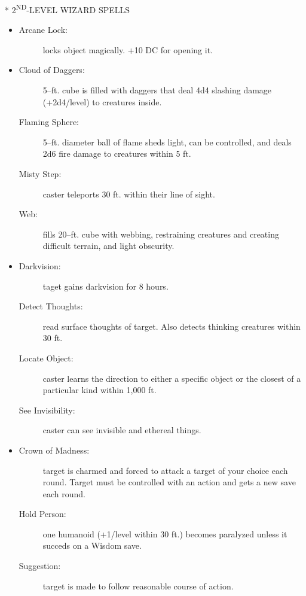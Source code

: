 \documentclass[DIV=14, paper=a4, fontsize=12pt, twocolumn, twoside]{scrartcl}
\makeatletter
\let\origsection\section
\renewcommand\section{\@ifstar{\starsection}{\nostarsection}}
\newcommand\nostarsection[1]
{\origsection{#1}\vspace{-0.5em}}
\newcommand\starsection[1]
{\vspace{-0.5cm}\origsection*{#1}\vspace{-0.3cm}}
\newcommand\invisiblesection[1]{%
  \refstepcounter{section}%
  \sectionmark{#1}
}
\newcommand\listsection[2]{%
	\invisiblesection{#2}
	\section*{\color{dndblue} #1}
}
\renewcommand\thesection{}
\makeatother
\begin{document}
\listsection{\color{dndblue}2\textsuperscript{ND}-LEVEL WIZARD SPELLS}{LEVEL 2}

\begin{itemize}[align=parleft,labelwidth=1cm]
	\renewcommand{\labelitemi}{Abjur}\item
	\begin{description}
 \item[Arcane Lock:] locks object magically. +10 DC for opening it.
\end{description}
\renewcommand{\labelitemi}{Conj}\item
\begin{description}
 \item[Cloud of Daggers:] 5–ft. cube is filled with daggers that deal 4d4 slashing damage (+2d4/level) to creatures inside.
 \item[Flaming Sphere:] 5–ft. diameter ball of flame sheds light, can be controlled, and deals 2d6 fire damage to creatures within 5 ft.
 \item[Misty Step:] caster teleports 30 ft. within their line of sight.
 \item[Web:] fills 20–ft. cube with webbing, restraining creatures and creating difficult terrain, and light obscurity.
\end{description}
\renewcommand{\labelitemi}{Div}\item
\begin{description}
 \item[Darkvision:] taget gains darkvision for 8 hours.
 \item[Detect Thoughts:] read surface thoughts of target. Also detects thinking creatures within 30 ft.
 \item[Locate Object:] caster learns the direction to either a specific object or the closest of a particular kind within 1,000 ft.
 \item[See Invisibility:] caster can see invisible and ethereal things.
\end{description}
\renewcommand{\labelitemi}{Ench}\item
\begin{description}
 \item[Crown of Madness:] target is charmed and forced to attack a target of your choice each round. Target must be controlled with an action and gets a new save each round.
 \item[Hold Person:] one humanoid (+1/level within 30 ft.) becomes paralyzed unless it succeds on a Wisdom save.
 \item[Suggestion:] target is made to follow reasonable course of action.

\end{description}
\end{itemize}
\end{document}
